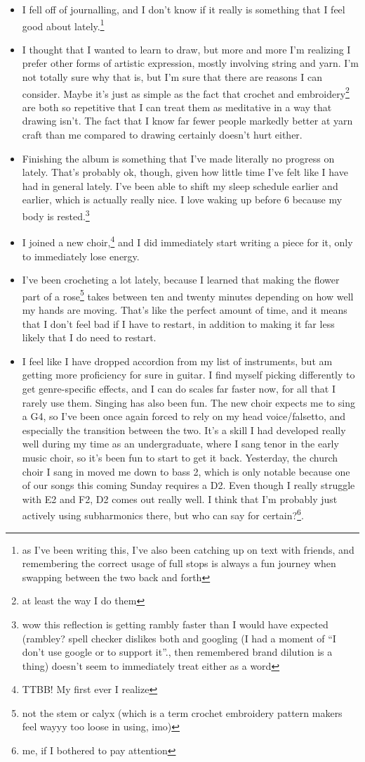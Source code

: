 \documentclass[12pt]{article}[titlepage]
\newcommand{\say}[1]{``#1''}
\renewcommand{\,}{\textsuperscript{,}}
\begin{document}
\begin{itemize}
\item I fell off of journalling, and I don't know if it really is something that I feel good about lately.\footnote{as I've been writing this, I've also been catching up on text with friends, and remembering the correct usage of full stops is always a fun journey when swapping between the two back and forth}  
\item I thought that I wanted to learn to draw, but more and more I'm realizing I prefer other forms of artistic expression, mostly involving string and yarn. I'm not totally sure why that is, but I'm sure that there are reasons I can consider. Maybe it's just as simple as the fact that crochet and embroidery\footnote{at least the way I do them} are both so repetitive that I can treat them as meditative in a way that drawing isn't. The fact that I know far fewer people markedly better at yarn craft than me compared to drawing certainly doesn't hurt either.  
\item Finishing the album is something that I've made literally no progress on lately. That's probably ok, though, given how little time I've felt like I have had in general lately. I've been able to shift my sleep schedule earlier and earlier, which is actually really nice. I love waking up before 6 because my body is rested.\footnote{wow this reflection is getting rambly faster than I would have expected (rambley? spell checker dislikes both and googling (I had a moment of \say{I don't use google or to support it}., then remembered brand dilution is a thing) doesn't seem to immediately treat either as a word}  
\item I joined a new choir,\footnote{TTBB! My first ever I realize} and I did immediately start writing a piece for it, only to immediately lose energy.  
\item I've been crocheting a lot lately, because I learned that making the flower part of a rose\footnote{not the stem or calyx (which is a term crochet embroidery pattern makers feel wayyy too loose in using, imo)} takes between ten and twenty minutes depending on how well my hands are moving. That's like the perfect amount of time, and it means that I don't feel bad if I have to restart, in addition to making it far less likely that I do need to restart.  
\item I feel like I have dropped accordion from my list of instruments, but am getting more proficiency for sure in guitar. I find myself picking differently to get genre-specific effects, and I can do scales far faster now, for all that I rarely use them.  
Singing has also been fun. The new choir expects me to sing a G4, so I've been once again forced to rely on my head voice/falsetto, and especially the transition between the two. It's a skill I had developed really well during my time as an undergraduate, where I sang tenor in the early music choir, so it's been fun to start to get it back. Yesterday, the church choir I sang in moved me down to bass 2, which is only notable because one of our songs this coming Sunday requires a D2. Even though I really struggle with E2 and F2, D2 comes out really well. I think that I'm probably just actively using subharmonics there, but who can say for certain?\footnote{me, if I bothered to pay attention}.


\end{itemize}
\end{document}
